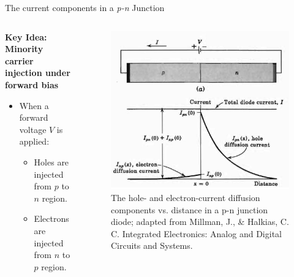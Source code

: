 \begin{frame}{The current components in a \textit{p-n} Junction}
\begin{columns}
		\begin{column}{0.225\textwidth}
	\textbf{Key Idea: Minority carrier injection under forward bias}
	\begin{itemize}
		\item When a forward voltage $V$ is applied:
		\begin{itemize}
			\item Holes are injected from $p$ to $n$ region.
			\item Electrons are injected from $n$ to $p$ region.
		\end{itemize}
	\end{itemize}
\end{column}
\begin{column}{0.775\textwidth}
	\begin{figure}
		\centering
		\includegraphics[scale=0.325]{fig/lec03/current_component_in_pn_junction.png}
		\caption{The hole- and electron-current diffusion components vs. distance in a p-n junction diode; adapted from Millman, J., \& Halkias, C. C. Integrated Electronics: Analog and Digital Circuits and Systems.}
		\label{fig:plot_of_pn_junction_current}
	\end{figure}
\end{column}
\end{columns}
\end{frame}

